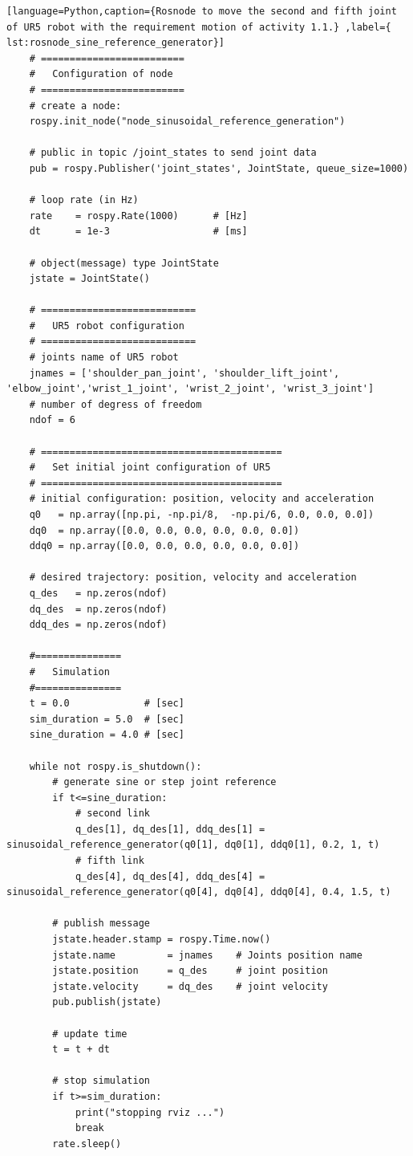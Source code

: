 \begin{lstlisting}[language=Python,caption={Rosnode to move the second and fifth joint of UR5 robot with the requirement motion of activity 1.1.} ,label={ lst:rosnode_sine_reference_generator}]
    # =========================
    #   Configuration of node
    # =========================
    # create a node: 
    rospy.init_node("node_sinusoidal_reference_generation")
    
    # public in topic /joint_states	to send joint data	
    pub = rospy.Publisher('joint_states', JointState, queue_size=1000)
    
    # loop rate (in Hz)
    rate 	= rospy.Rate(1000)		# [Hz]
    dt 		= 1e-3					# [ms]
    
    # object(message) type JointState
    jstate = JointState()
    
    # ===========================
    #   UR5 robot configuration
    # ===========================
    # joints name of UR5 robot
    jnames = ['shoulder_pan_joint', 'shoulder_lift_joint', 'elbow_joint','wrist_1_joint', 'wrist_2_joint', 'wrist_3_joint']
    # number of degress of freedom
    ndof = 6
    
    # ==========================================
    #   Set initial joint configuration of UR5
    # ==========================================
    # initial configuration: position, velocity and acceleration 
    q0   = np.array([np.pi, -np.pi/8,  -np.pi/6, 0.0, 0.0, 0.0])
    dq0  = np.array([0.0, 0.0, 0.0, 0.0, 0.0, 0.0])
    ddq0 = np.array([0.0, 0.0, 0.0, 0.0, 0.0, 0.0]) 
    
    # desired trajectory: position, velocity and acceleration
    q_des   = np.zeros(ndof)
    dq_des  = np.zeros(ndof)
    ddq_des = np.zeros(ndof)
    
    #===============
    #   Simulation
    #===============
    t = 0.0             # [sec] 
    sim_duration = 5.0  # [sec]
    sine_duration = 4.0 # [sec]
    
    while not rospy.is_shutdown():
        # generate sine or step joint reference
        if t<=sine_duration:
            # second link
            q_des[1], dq_des[1], ddq_des[1] = sinusoidal_reference_generator(q0[1], dq0[1], ddq0[1], 0.2, 1, t)
            # fifth link
            q_des[4], dq_des[4], ddq_des[4] = sinusoidal_reference_generator(q0[4], dq0[4], ddq0[4], 0.4, 1.5, t)
    
        # publish message
        jstate.header.stamp = rospy.Time.now()
        jstate.name 		= jnames    # Joints position name
        jstate.position 	= q_des     # joint position
        jstate.velocity 	= dq_des    # joint velocity
        pub.publish(jstate)
    
        # update time
        t = t + dt

        # stop simulation
        if t>=sim_duration:
            print("stopping rviz ...")
            break  
        rate.sleep()
\end{lstlisting}


